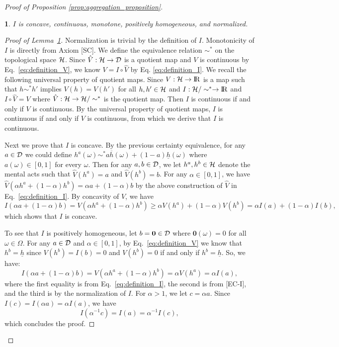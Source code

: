 \documentclass[11pt,oneside]{article}
\theoremstyle{plain}
\theoremstyle{plain}
\theoremstyle{plain}
\theoremstyle{plain}
\theoremstyle{plain}
\theoremstyle{definition}
\theoremstyle{definition}
\theoremstyle{remark}
\theoremstyle{plain}
\newtheorem{lem}[thm]{\protect\lemmaname}
\providecommand{\lemmaname}{Lemma}
\newcommand{\R}{{\rm I\!R}}
\newcommand{\ulh}{\underline{h}}
\newcommand{\olh}{\overline{h}}
\renewcommand{\Re}{\R}
\renewcommand{\Re}{\R}
\newcommand{\convmix}[2]{\alpha #1 + (1-\alpha) #2}
\newcommand{\convexmix}[3]{#3 #1 + (1-#3) #2}
\begin{document}
\begin{proof}[Proof of Proposition \ref{prop:aggregation_proposition}]
\begin{lem}
    \label{lem:MEU_DROP_lem1}
    $I$ is concave, continuous, monotone, positively homogeneous, and normalized.
\end{lem}
\begin{proof}[Proof of Lemma~\ref{lem:MEU_DROP_lem1}]
    Normalization is trivial by the definition of $I$. Monotonicity of $I$ is directly from Axiom [SC]. 
    We define the equivalence relation $\sim^*$ on the topological space ${\cal H}$. 
    Since $\hat{V}:{\cal H} \to {\cal D}$ is a quotient map and $V$ is continuous by Eq.~\eqref{eq:definition_V}, 
    we know $V = I \circ \hat{V}$ by Eq. \eqref{eq:definition_I}. 
    We recall the following universal property of quotient maps.
    Since $V:{\cal H}\to \Re$ is a map such that $h \sim^* h'$ implies $V(h) =V(h')$ for all $h,h'  \in {\cal H}$ and $I:{\cal H}/\sim^* \to \Re$ and $I \circ \hat{V} = V$ where $\hat{V}:{\cal H}\to {\cal H}/\sim^*$ is the quotient map. Then $I$ is continuous if and only if $V$ is continuous.
    By the universal property of quotient maps, $I$ is continuous if and only if $V$ is continuous, from which we derive that $I$ is continuous.
    
    Next we prove that $I$ is concave.
    By the previous certainty equivalence, for any $a\in {\cal D}$ we could define $h^a(\omega) \sim^* \convexmix{\olh(\omega)}{\ulh(\omega)}{a}$ where $a(\omega) \in [0,1]$ for every $\omega$.
    Then for any $a,b \in {\cal D}$, we let $h^a,h^b \in {\cal H}$ denote
    the mental acts such that $\hat{V}(h^a) = a$ and $\hat{V}(h^b) = b$. 
    For any $\alpha \in [0,1]$, we have $\hat{V}(\convmix{h^a}{h^b}) = \convmix{a}{b}$  by the above construction of $\hat{V}$ in Eq.~\eqref{eq:definition_I}. By concavity of $V$, we have
    $$
    I(\convmix{a}{b})= V(\convmix{h^a}{h^b}) \geq \convmix{V(h^a)}{V(h^b)}= \convmix{I(a)}{I(b)},
    $$
    which shows that $I$ is concave.

    To see that $I$ is positively homogeneous, let $b = \boldsymbol{0} \in {\cal D}$ where $\boldsymbol{0}(\omega) = 0$ for all $\omega \in \Omega$.
    For any $a \in {\cal D}$ and $\alpha \in [0,1]$, by Eq.~\eqref{eq:definition_V} we know that $h^b = \ulh$ since $V(h^b) = I(b) = 0$ and $V(h^b) =0$ if and only if $h^b = \ulh$. So, we have:
    $$
    I(\alpha a + (1-\alpha)b) = V(\convexmix{h^a}{h^b}{\alpha}) = \alpha V(h^a) = \alpha I(a),
    $$
    where the first equality is from Eq.~\eqref{eq:definition_I}, the second is from [EC-I], and the third is by the normalization of $I$. For $\alpha>1$, we let $c = \alpha a$. Since $I(c) = I(\alpha a) = \alpha I(a)$,
    we have
    $$
    I(\alpha^{-1}c) = I(a) = \alpha^{-1}I(c),
    $$
    which concludes the proof.
\end{proof}


\end{proof}
\end{document}
